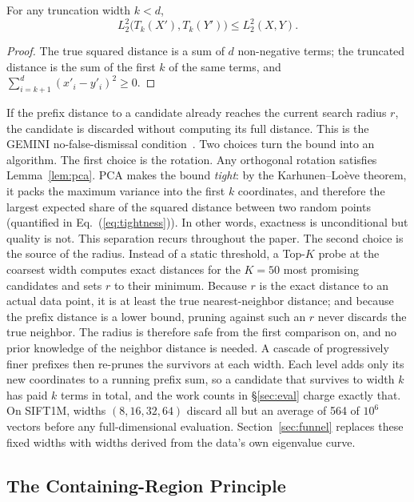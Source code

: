 \documentclass[sigconf, nonacm]{acmart}
\begin{document}
\begin{lemma}
\label{lem:pca}
For any truncation width $k < d$,
\[ L_2^2\bigl(T_k(X'), T_k(Y')\bigr) \le L_2^2(X, Y). \]
\end{lemma}

\begin{proof}
The true squared distance is a sum of $d$ non-negative terms; the truncated
distance is the sum of the first $k$ of the same terms, and
$\sum_{i=k+1}^{d} (x'_i - y'_i)^2 \ge 0$.
\end{proof}

If the prefix distance to a candidate already reaches the current search
radius $r$, the candidate is discarded without computing its full
distance. This is the GEMINI no-false-dismissal
condition~\cite{gemini}. Two choices turn the bound into an algorithm.
The first choice is the rotation. Any orthogonal rotation satisfies
Lemma~\ref{lem:pca}. PCA makes the bound \emph{tight}: by the
Karhunen--Lo\`eve theorem, it packs the maximum variance into the first
$k$ coordinates, and therefore the largest expected share of the squared
distance between two random points (quantified in
Eq.~(\ref{eq:tightness})). In other
words, exactness is unconditional but quality is not. This separation
recurs throughout the paper. The second choice is the source of the
radius. Instead of a static threshold, a Top-$K$ probe at the coarsest
width computes exact distances for the $K = 50$ most promising candidates
and sets $r$ to their minimum. Because $r$ is the exact distance to an
actual data point, it is at least the true nearest-neighbor distance; and
because the prefix distance is a lower bound, pruning against such an $r$
never discards the true neighbor. The radius is therefore safe from the
first comparison on, and no prior knowledge of the neighbor distance is
needed. A cascade of progressively finer prefixes then re-prunes the
survivors at each width. Each level adds only its new coordinates to a
running prefix sum, so a candidate that survives to width $k$ has paid
$k$ terms in total, and the work counts in \S\ref{sec:eval} charge
exactly that. On SIFT1M, widths
$(8,16,32,64)$ discard all but an average of 564 of $10^6$ vectors before
any full-dimensional evaluation. Section~\ref{sec:funnel} replaces these
fixed widths with widths derived from the data's own eigenvalue curve.

\subsection{The Containing-Region Principle}
\end{document}
